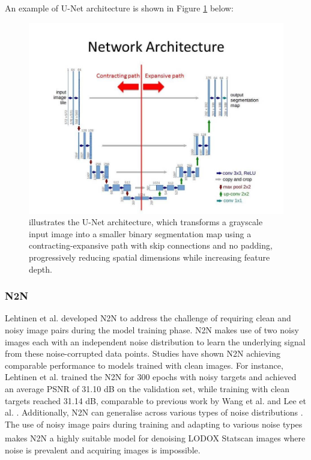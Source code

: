 An example of \gls{U-Net} architecture is shown in Figure \ref{fig:Unet} below:
\begin{figure}[h!]
	\centering
	\includegraphics[width=0.7\linewidth]{3_Chapters//3_Chapter_Methodology//Figures/Unet.jpg}
	\caption{illustrates the \gls{U-Net} architecture, which transforms a grayscale input image into a smaller binary segmentation map using a contracting-expansive path with skip connections and no padding, progressively reducing spatial dimensions while increasing feature depth.}
	\label{fig:Unet}
\end{figure}

\subsubsection*{\gls{N2N}}
Lehtinen et al. \cite{pmlr-v80-lehtinen18a} developed \gls{N2N}  to address the challenge of requiring clean and noisy image pairs during the model training phase. \gls{N2N} makes use of two noisy images each with an independent noise distribution to learn the underlying signal from these noise-corrupted data points. Studies have shown \gls{N2N} achieving comparable performance to models trained with clean images. For instance, Lehtinen et al. \cite{pmlr-v80-lehtinen18a} trained the \gls{N2N} for 300 epochs with noisy targets and achieved an average \gls{PSNR} of 31.10 dB on the validation set, while training with clean targets reached 31.14 dB, comparable to previous work by Wang et al. \cite{wang2016accelerating} and Lee et al. \cite{7950457}. Additionally, \gls{N2N} can generalise across various types of noise distributions \cite{pmlr-v80-lehtinen18a}. The use of noisy image pairs during training and adapting to various noise types makes \gls{N2N} a highly suitable model for denoising LODOX\textsuperscript{\textregistered} Statscan\textsuperscript{\textregistered} images where noise is prevalent and acquiring images is impossible.

